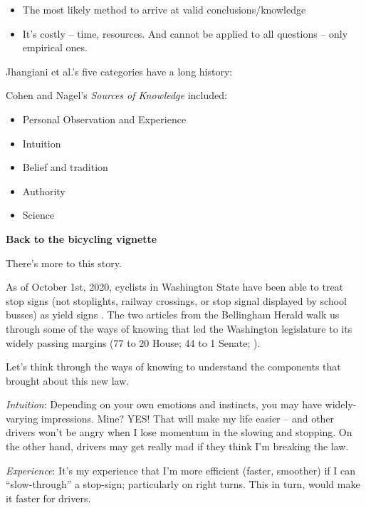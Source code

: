 \documentclass[
  english,
]{book}
\providecommand{\tightlist}{%
  \setlength{\itemsep}{0pt}\setlength{\parskip}{0pt}}
\begin{document}
\begin{itemize}
  \begin{itemize}
  \tightlist
  \item
    The most likely method to arrive at valid conclusions/knowledge
  \item
    It's costly -- time, resources. And cannot be applied to all questions -- only empirical ones.
  \end{itemize}
\end{itemize}

Jhangiani et al.'s \citeyearpar{jhangiani_research_2019} five categories have a long history:

Cohen and Nagel's \citeyearpar{cohen_introduction_1934} \emph{Sources of Knowledge} included:

\begin{itemize}
\tightlist
\item
  Personal Observation and Experience
\item
  Intuition
\item
  Belief and tradition
\item
  Authority
\item
  Science
\end{itemize}

\textbf{Back to the bicycling vignette}

There's more to this story.

As of October 1st, 2020, cyclists in Washington State have been able to treat stop signs (not stoplights, railway crossings, or stop signal displayed by school busses) as yield signs \citep{dahl_heres_2020, dahl_new_2020}. The two articles from the Bellingham Herald walk us through some of the ways of knowing that led the Washington legislature to its widely passing margins (77 to 20 House; 44 to 1 Senate; \citep{fucoloro_bipartisan_2020}).

Let's think through the ways of knowing to understand the components that brought about this new law.

\emph{Intuition}: Depending on your own emotions and instincts, you may have widely-varying impressions. Mine? YES! That will make my life easier -- and other drivers won't be angry when I lose momentum in the slowing and stopping. On the other hand, drivers may get really mad if they think I'm breaking the law.

\emph{Experience}: It's my experience that I'm more efficient (faster, smoother) if I can ``slow-through'' a stop-sign; particularly on right turns. This in turn, would make it faster for drivers.
\end{document}

